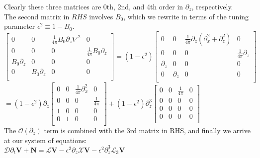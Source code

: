 \documentclass[letterpaper,12pt]{article}
\begin{document}
Clearly these three matrices are 0th, 2nd, and 4th order in $\partial_z$, respectively. \\

The second matrix in $RHS$ involves $B_0$, which we rewrite in terms of the tuning parameter $\epsilon^2 \equiv 1 - B_0$. \\

$\left[\begin{matrix}
0 & 0 & \frac{1}{4\pi}B_0 \partial_z \nabla^2 & 0 \\
0 & 0 & 0 & \frac{1}{4\pi} B_0 \partial_z \\
B_0 \partial_z & 0 & 0 & 0 \\
0 & B_0 \partial_z & 0 & 0 \\ \end{matrix}\right] = (1 - \epsilon^2) \left[\begin{matrix}
0 & 0 & \frac{1}{4\pi}\partial_z(\partial_x^2 + \partial_z^2) & 0 \\
0 & 0 & 0 & \frac{1}{4\pi}\partial_z \\
\partial_z & 0 & 0 & 0 \\
0 & \partial_z & 0 & 0 \\ \end{matrix}\right] $ \\

$ = (1 - \epsilon^2)\partial_z\left[\begin{matrix}
0 & 0 & \frac{1}{4\pi}\partial_x^2 & 0 \\
0 & 0 & 0 & \frac{1}{4\pi} \\
1 & 0 & 0 & 0 \\
0 & 1 & 0 & 0 \\ \end{matrix} \right] + (1 - \epsilon^2)\partial_z^3 \left[\begin{matrix}
0 & 0 & \frac{1}{4\pi} & 0 \\
0 & 0 & 0 & 0 \\
0 & 0 & 0 & 0 \\
0 & 0 & 0 & 0 \\ \end{matrix} \right] $ \\

The $\mathcal{O}(\partial_z)$ term is combined with the 3rd matrix in RHS, and finally we arrive at our system of equations: \\

$\mathcal{D}\partial_t \mathbf{V} + \mathbf{N} = \mathcal{L} \mathbf{V} - \epsilon^2\partial_z\mathcal{X} \mathbf{V} - \epsilon^2 \partial_z^3 \mathcal{L}_3\mathbf{V}$ \\
\end{document}
